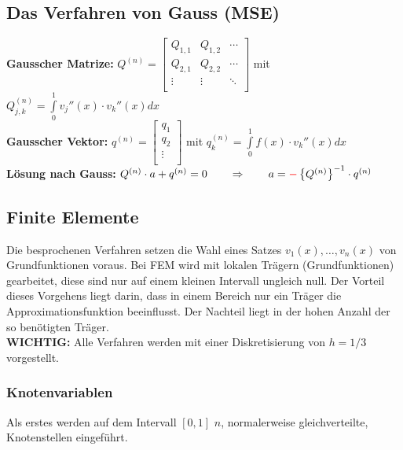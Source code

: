 \subsection{Das Verfahren von Gauss (MSE)}

\textbf{Gausscher Matrize: }
$Q^{(n)}=\begin{bmatrix}
		Q_{1,1} & Q_{1,2} & \cdots \\
		Q_{2,1} & Q_{2,2} & \cdots \\
		\vdots  & \vdots  & \ddots \\
	\end{bmatrix}$ \qquad mit \qquad $Q_{j,k}^{(n)}=\int\limits_{0}^{1}{v_j''(x)\cdot v_k''(x) dx}$\\
\textbf{Gausscher Vektor: }
$q^{(n)}=\begin{bmatrix}
		q_1    \\
		q_2    \\
		\vdots \\
	\end{bmatrix}$ \qquad mit \qquad $q_{k}^{(n)}=\int\limits_{0}^{1}{f(x)\cdot v_k''(x) dx}$\\

\textbf{Lösung nach Gauss:} $Q^{(n)}\cdot a+q^{(n)}=0\qquad \Rightarrow \qquad a=\textcolor{red}{\mathbf{-}}\left\{Q^{(n)}\right\}^{-1}\cdot q^{(n)}$

\subsection{Finite Elemente}

Die besprochenen Verfahren setzen die Wahl eines Satzes $v_1(x),\ldots,v_n(x)$ von Grundfunktionen voraus. Bei FEM wird mit lokalen Trägern (Grundfunktionen) gearbeitet, diese sind nur auf einem kleinen Intervall ungleich null. Der Vorteil dieses Vorgehens liegt darin, dass in einem Bereich nur ein Träger die Approximationsfunktion beeinflusst. Der Nachteil liegt in der hohen Anzahl der so benötigten Träger.\\

\textbf{WICHTIG:} Alle Verfahren werden mit einer Diskretisierung von $h=1/3$
vorgestellt.

\subsubsection{Knotenvariablen}
Als erstes werden auf dem Intervall $[0,1]$ $n$, normalerweise gleichverteilte, Knotenstellen eingeführt.

